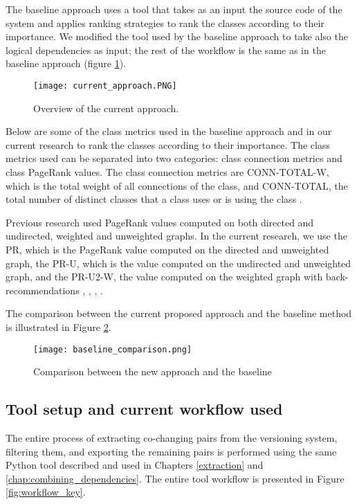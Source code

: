 \hspace{4em}The baseline approach uses a tool that takes as an input the source code of the system and applies ranking strategies to rank the classes according to their importance. We modified the tool used by the baseline approach to take also the logical dependencies as input; the rest of the workflow is the same as in the baseline approach (figure \ref{fig:baseline_approach}).
\begin{figure}[H]
\centering
\texttt{[image: current\_approach.PNG]}
\caption{Overview of the current approach.}
\label{fig:baseline_approach}
\end{figure}

Below are some of the class metrics used in the baseline approach and in our current research to rank the classes according to their importance. The class metrics used can be separated into two categories: class connection metrics and class PageRank values. The class connection metrics are CONN-TOTAL-W, which is the total weight of all connections of the class, and CONN-TOTAL, the total number of distinct classes that a class uses or is using the class \cite{Finding-key-classes}.

Previous research used PageRank values computed on both directed and undirected, weighted and unweighted graphs. In the current research, we use the PR, which is the PageRank value computed on the directed and unweighted graph, the PR-U, which is the value computed on the undirected and unweighted graph, and the PR-U2-W, the value computed on the weighted graph with back-recommendations \cite{PagerankENASE}, \cite{enase15}, \cite{Finding-key-classes}, \cite{PagerankSACI}.

The comparison between the current proposed approach and the baseline method is illustrated in Figure \ref{fig:baseline_comparison}. 
\begin{figure}[H]
\centering
\texttt{[image: baseline\_comparison.png]}
\caption{ Comparison between the new approach and the baseline }
\label{fig:baseline_comparison}
\centering
\end{figure}


\subsection{Tool setup and current workflow used}
\label{subsec:key_tool}

\hspace{4em}The entire process of extracting co-changing pairs from the versioning system, filtering them, and exporting the remaining pairs is performed using the same Python tool described and used in Chapters \ref{extraction} and \ref{chap:combining_dependencies}. The entire tool workflow is presented in Figure \ref{fig:workflow_key}.

